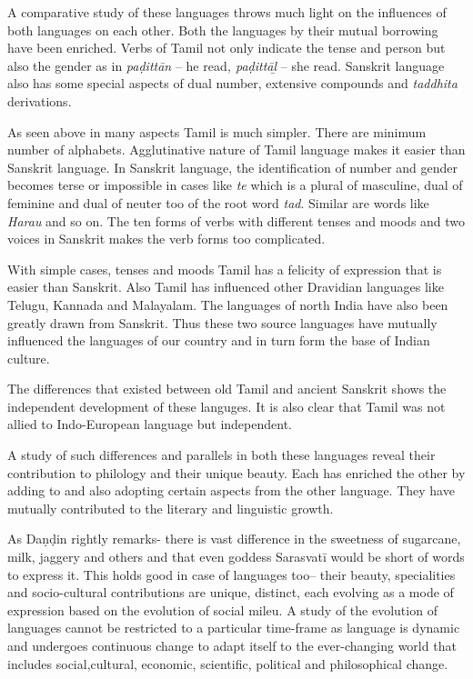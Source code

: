 A comparative study of these languages throws much light on the influences of both languages on each other. Both the languages by their mutual borrowing have been enriched. Verbs of Tamil not only indicate the tense and person but also the gender as in \textit{paḍittān} – he read\textit{, paḍittāḻ} – she read. Sanskrit language also has some special aspects of dual number, extensive compounds and \textit{taddhita} derivations.

As seen above in many aspects Tamil is much simpler. There are minimum number of alphabets. Agglutinative nature of Tamil language makes it easier than Sanskrit language. In Sanskrit language, the identification of number and gender becomes terse or impossible in cases like \textit{te} which is a plural of masculine, dual of feminine and dual of neuter too of the root word \textit{tad}. Similar are words like \textit{Harau} and so on. The ten forms of verbs with different tenses and moods and two voices in Sanskrit makes the verb forms too complicated.

With simple cases, tenses and moods Tamil has a felicity of expression that is easier than Sanskrit. Also Tamil has influenced other Dravidian languages like Telugu, Kannada and Malayalam. The languages of north India have also been greatly drawn from Sanskrit. Thus these two source languages have mutually influenced the languages of our country and in turn form the base of Indian culture.

The differences that existed between old Tamil and ancient Sanskrit shows the independent development of these languges. It is also clear that Tamil was not allied to Indo-European language but independent.

A study of such differences and parallels in both these languages reveal their contribution to philology and their unique beauty. Each has enriched the other by adding to and also adopting certain aspects from the other language. They have mutually contributed to the literary and linguistic growth.

As Daṇḍin rightly remarks- there is vast difference in the sweetness of sugarcane, milk, jaggery and others and that even goddess Sarasvatī would be short of words to express it. This holds good in case of languages too– their beauty, specialities and socio-cultural contributions are unique, distinct, each evolving as a mode of expression based on the evolution of social mileu. A study of the evolution of languages cannot be restricted to a particular time-frame as language is dynamic and undergoes continuous change to adapt itself to the ever-changing world that includes social,cultural, economic, scientific, political and philosophical change.


